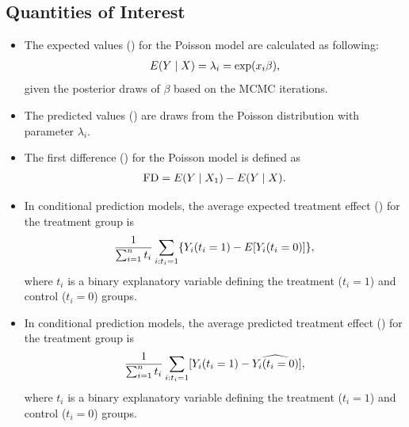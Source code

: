 \documentclass[letterpaper,10pt,english]{sphinxmanual}
\begin{document}
\subsection{Quantities of Interest}
\label{vignette:id96}\begin{itemize}
\item {} 
The expected values () for the Poisson model are calculated
as following:
\begin{gather}
\begin{split}\begin{aligned}
E(Y\mid X) = \lambda_i = \exp(x_i \beta),\end{aligned}\end{split}\notag
\end{gather}
given the posterior draws of \(\beta\) based on the MCMC
iterations.

\item {} 
The predicted values () are draws from the Poisson
distribution with parameter \(\lambda_i\).

\item {} 
The first difference () for the Poisson model is defined as
\begin{gather}
\begin{split}\begin{aligned}
\text{FD}=E(Y\mid X_{1})-E(Y\mid X).\end{aligned}\end{split}\notag
\end{gather}
\item {} 
In conditional prediction models, the average expected treatment
effect () for the treatment group is
\begin{gather}
\begin{split}\begin{aligned}
\frac{1}{\sum_{i=1}^n t_{i}}\sum_{i:t_{i}=1}\{Y_{i}(t_{i}=1)-E[Y_{i}(t_{i}=0)]\},\end{aligned}\end{split}\notag
\end{gather}
where \(t_{i}\) is a binary explanatory variable defining the
treatment (\(t_{i}=1\)) and control (\(t_{i}=0\)) groups.

\item {} 
In conditional prediction models, the average predicted treatment
effect () for the treatment group is
\begin{gather}
\begin{split}\begin{aligned}
\frac{1}{\sum_{i=1}^n t_{i}}\sum_{i:t_{i}=1}[Y_{i}(t_{i}=1)-\widehat{Y_{i}(t_{i}=0)}],\end{aligned}\end{split}\notag
\end{gather}
where \(t_{i}\) is a binary explanatory variable defining the
treatment (\(t_{i}=1\)) and control (\(t_{i}=0\)) groups.

\end{itemize}
\end{document}
